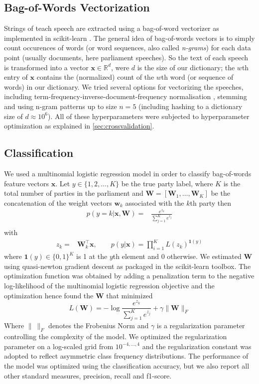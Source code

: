 \documentclass{article} %
\renewcommand{\vec}[1]{\mathbf{#1}}
\begin{document}
\subsection{Bag-of-Words Vectorization}\label{sec:bow-vectorization}
Strings of teach speech are extracted using a bag-of-word vectorizer as implemented in scikit-learn \cite{scikit-learn}. The general idea of bag-of-words vectors is to simply count occurences of words (or word sequences, also called {\em n-grams}) for each data point (usually documents, here parliament speeches). So the text of each speech is transformed into a vector $\vec{x}\in\mathds{R}^d$, were $d$ is the size of our dictionary; the $w$th entry of $\vec{x}$ contains the (normalized) count of the $w$th word (or sequence of words) in our dictionary. We tried several options for vectorizing the speeches, including term-frequency-inverse-document-frequency normalisation \cite{tfidf}, stemming \cite{stemming} and using n-gram patterns up to size $n=5$ (including hashing to a dictionary size of $d\approx10^6$). All of these hyperparameters were subjected to hyperparameter optimization as explained in \autoref{sec:crossvalidation}. 

\subsection{Classification}
We used a multinomial logistic regression model in order to classify bag-of-words feature vectors $\vec{x}$. Let $y\in\{1,2,\dots,K\}$ be the true party label, where $K$ is the total number of parties in the parliament and $\vec{W}=[\vec{W}_1,\dots,\vec{W}_K]$ be the concatenation of the weight vectors $\vec{w}_k$ associated with the $k$th party then 
\begin{eqnarray}\label{eq:logreg_multiclass}
p(y=k|\vec{x},\vec{W}) = &\frac{e^{z_k}}{\sum_{j=1}^K e^{z_j}}\\\nonumber
\end{eqnarray}
with
\begin{eqnarray*}
 z_k=&\vec{W}_k^{\top}\vec{x}, \qquad
 p(y|\vec{x}) = \prod_{i=1}^K L(z_k)^{\vec{1}(y)}
\end{eqnarray*}
where $\vec{1}(y)\in\{0,1\}^{K}$ is 1 at the $y$th element and 0 otherwise. We estimated $\vec{W}$ using quasi-newton gradient descent as packaged in the scikit-learn toolbox. The optimization function was obtained by adding a penalization term to the negative log-likelihood of the multinomial logistic regression objective and the optimization hence found the $\vec{W}$ that minimized
\begin{equation}\label{eq:objective}
L(\vec{W}) = - \log{\frac{e^{z_k}}{\sum_{j=1}^K e^{z_j}}}+ \gamma \| \vec{W} \|_{F}
\end{equation}
Where $\|~\|_F$ denotes the Frobenius Norm and $\gamma$ is a regularization parameter controlling the complexity of the model. 
 We optimized the regularization parameter on a log-scaled grid from $10^{-4,\dots,4}$ and the regularization constant was adopted to reflect asymmetric class frequency distributions. The performance of the model was optimized using the classification accuracy, but we also report all other standard measures, precision, recall and f1-score. 
\end{document}
